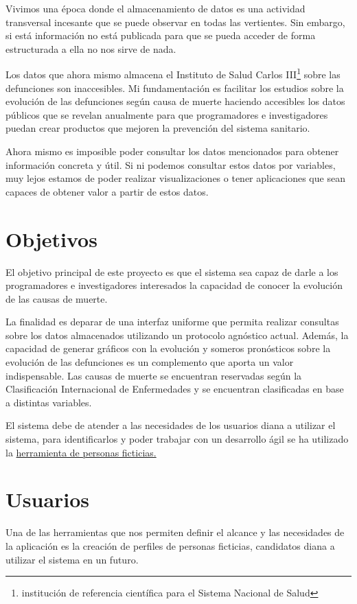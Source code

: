 Vivimos una época donde el almacenamiento de datos es una actividad transversal incesante
que se puede observar en todas las vertientes. Sin embargo, si está información no está
publicada para que se pueda acceder de forma estructurada a ella no nos sirve de nada. 

Los datos que ahora mismo almacena el Instituto de Salud Carlos III\footnote{institución de
referencia científica para el Sistema Nacional de Salud} sobre las defunciones son inaccesibles.  Mi
fundamentación es facilitar los estudios sobre la evolución de las defunciones según causa
de muerte haciendo accesibles los datos públicos que se revelan anualmente para que
programadores e investigadores puedan crear productos que mejoren la prevención del sistema sanitario.

Ahora mismo es imposible poder consultar los datos mencionados para obtener información
concreta y útil.  Si ni podemos consultar estos datos por variables, muy lejos estamos de
poder realizar visualizaciones o tener aplicaciones que sean capaces de obtener valor a
partir de estos datos.

\section{Objetivos}
\label{sec:obj}
El objetivo principal de este proyecto es que el sistema sea capaz de darle a los
programadores e investigadores interesados la capacidad de conocer la evolución de las causas de muerte. 

La finalidad es deparar de una interfaz uniforme que permita realizar consultas
sobre los datos almacenados utilizando un protocolo agnóstico actual. Además, la
capacidad de generar gráficos con la evolución y someros pronósticos sobre la evolución 
de las defunciones es un complemento que aporta un valor indispensable. Las causas de
muerte se encuentran reservadas según la Clasificación Internacional
de Enfermedades y se encuentran clasificadas en base a distintas variables. 

El sistema debe de atender a las necesidades de los usuarios diana a utilizar el sistema, para
identificarlos y poder trabajar con un desarrollo ágil se ha utilizado la
\hyperref[sec:usu]{herramienta de personas ficticias.}

\section{Usuarios}
\label{sec:usu}
Una de las herramientas que nos permiten definir el alcance y las necesidades de la
aplicación es la creación de perfiles de personas ficticias, candidatos diana a utilizar
el sistema en un futuro.

